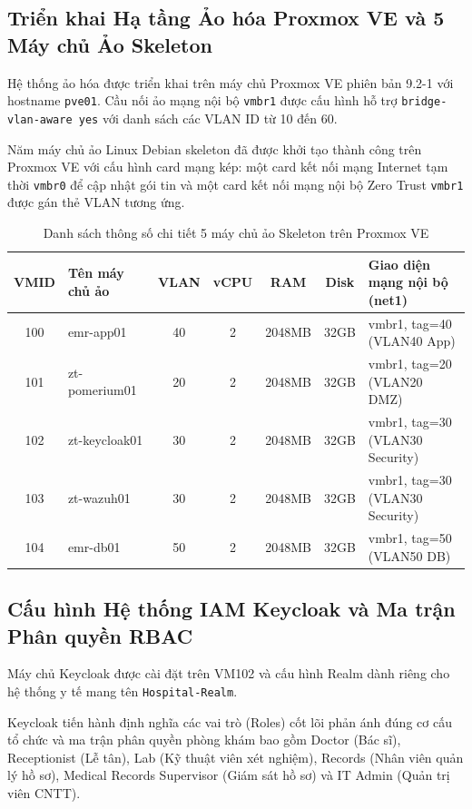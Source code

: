 \subsection{Triển khai Hạ tầng Ảo hóa Proxmox VE và 5 Máy chủ Ảo Skeleton}

Hệ thống ảo hóa được triển khai trên máy chủ Proxmox VE phiên bản 9.2-1 với hostname \texttt{pve01}. Cầu nối ảo mạng nội bộ \texttt{vmbr1} được cấu hình hỗ trợ \texttt{bridge-vlan-aware yes} với danh sách các VLAN ID từ 10 đến 60.

Năm máy chủ ảo Linux Debian skeleton đã được khởi tạo thành công trên Proxmox VE với cấu hình card mạng kép: một card kết nối mạng Internet tạm thời \texttt{vmbr0} để cập nhật gói tin và một card kết nối mạng nội bộ Zero Trust \texttt{vmbr1} được gán thẻ VLAN tương ứng.

\begin{table}[H]
\centering
\caption{Danh sách thông số chi tiết 5 máy chủ ảo Skeleton trên Proxmox VE}
\label{tab:vm_skeletons}
\begin{tabular}{| c | p{2.8cm} | c | c | c | c | p{3.2cm} |}
\hline
\textbf{VMID} & \textbf{Tên máy chủ ảo} & \textbf{VLAN} & \textbf{vCPU} & \textbf{RAM} & \textbf{Disk} & \textbf{Giao diện mạng nội bộ (net1)} \\ \hline
100 & emr-app01 & 40 & 2 & 2048MB & 32GB & vmbr1, tag=40 (VLAN40 App) \\ \hline
101 & zt-pomerium01 & 20 & 2 & 2048MB & 32GB & vmbr1, tag=20 (VLAN20 DMZ) \\ \hline
102 & zt-keycloak01 & 30 & 2 & 2048MB & 32GB & vmbr1, tag=30 (VLAN30 Security) \\ \hline
103 & zt-wazuh01 & 30 & 2 & 2048MB & 32GB & vmbr1, tag=30 (VLAN30 Security) \\ \hline
104 & emr-db01 & 50 & 2 & 2048MB & 32GB & vmbr1, tag=50 (VLAN50 DB) \\ \hline
\end{tabular}
\end{table}

\subsection{Cấu hình Hệ thống IAM Keycloak và Ma trận Phân quyền RBAC}

Máy chủ Keycloak được cài đặt trên VM102 và cấu hình Realm dành riêng cho hệ thống y tế mang tên \texttt{Hospital-Realm}.

Keycloak tiến hành định nghĩa các vai trò (Roles) cốt lõi phản ánh đúng cơ cấu tổ chức và ma trận phân quyền phòng khám bao gồm Doctor (Bác sĩ), Receptionist (Lễ tân), Lab (Kỹ thuật viên xét nghiệm), Records (Nhân viên quản lý hồ sơ), Medical Records Supervisor (Giám sát hồ sơ) và IT Admin (Quản trị viên CNTT).

